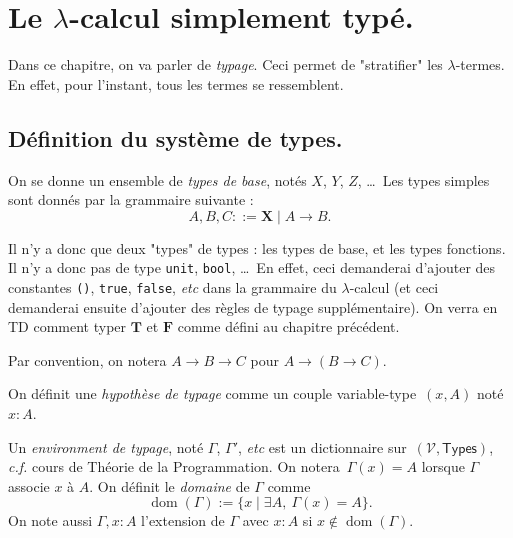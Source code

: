 \documentclass[./main]{subfiles}
\begin{document}
  \chapter{Le $\lambda$-calcul simplement typé.}

  Dans ce chapitre, on va parler de \textit{typage}. Ceci permet de "stratifier" les $\lambda$-termes.
  En effet, pour l'instant, tous les termes se ressemblent.

  \section{Définition du système de types.}

  \begin{defn}
    On se donne un ensemble de \textit{types de base}, notés $X$, $Y$, $Z$, \ldots\
    Les types simples sont donnés par la grammaire suivante :
    \[
      A, B, C ::= \boldsymbol{X}  \mid A \to B
    .\]
  \end{defn}

  Il n'y a donc que deux "types" de types : les types de base, et les types fonctions.
  Il n'y a donc pas de type \lstinline|unit|, \lstinline|bool|, \ldots\ En effet, ceci demanderai d'ajouter des constantes \lstinline|()|, \lstinline|true|, \lstinline|false|, \textit{etc} dans la grammaire du $\lambda$-calcul (et ceci demanderai ensuite d'ajouter des règles de typage supplémentaire). On verra en TD comment typer  $\mathbf{T}$ et $\mathbf{F}$ comme défini au chapitre précédent.

  Par convention, on notera $A \to B \to C$ pour $A \to (B \to C)$.

  \begin{defn}
    On définit une \textit{hypothèse de typage} comme un couple variable-type~$(x, A)$ noté $x: A$.
  \end{defn}

  \begin{defn}
    Un \textit{environment de typage}, noté $\Gamma$, $\Gamma'$,  \textit{etc} est un dictionnaire sur~$(\mathcal{V}, \mathsf{Types})$, \textit{c.f.} cours de Théorie de la Programmation.
    On notera~$\Gamma(x) = A$ lorsque  $\Gamma$ associe  $x$ à $A$. On définit le \textit{domaine} de $\Gamma$ comme \[
      \operatorname{dom}(\Gamma) := \{x  \mid \exists A, \: \Gamma(x) = A\}
    .\]
    On note aussi $\Gamma, x : A$ l'extension de  $\Gamma$ avec $x : A$ si $x\not\in \operatorname{dom}(\Gamma)$.
  \end{defn}
\end{document}

